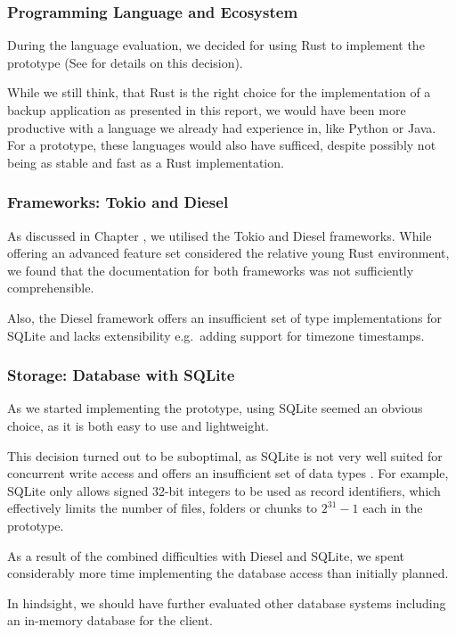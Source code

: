 \subsubsection{Programming Language and Ecosystem}
During the language evaluation, we decided for using Rust to implement the prototype (See  for details on this decision).

While we still think, that Rust is the right choice for the implementation of a backup application as presented in this report, we would have been more productive with a language we already had experience in, like Python or Java. For a prototype, these languages would also have sufficed, despite possibly not being as stable and fast as a Rust implementation.

\subsubsection{Frameworks: Tokio and Diesel}
As discussed in Chapter , we utilised the Tokio and Diesel frameworks. While offering an advanced feature set considered the relative young Rust environment, we found that the documentation for both frameworks was not sufficiently comprehensible.

Also, the Diesel framework offers an insufficient set of type implementations for SQLite and lacks extensibility e.g.~adding support for timezone timestamps.

\subsubsection{Storage: Database with SQLite}
As we started implementing the prototype, using SQLite seemed an obvious choice, as it is both easy to use and lightweight.

This decision turned out to be suboptimal, as SQLite is not very well suited for concurrent write access \cite{sqlite-locking} and offers an insufficient set of data types \cite{sqlite-datatypes}. For example, SQLite only allows signed 32-bit integers to be used as record identifiers, which effectively limits the number of \glspl{file}, folders or \glspl{chunk} to $2^{31}-1$ each in the prototype.

As a result of the combined difficulties with Diesel and SQLite, we spent considerably more time implementing the database access than initially planned.

In hindsight, we should have further evaluated other database systems including an in-memory database for the \gls{client}.

